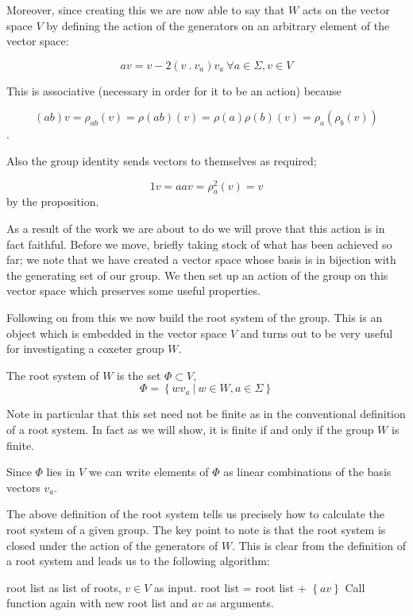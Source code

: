 \documentclass[a4paper,12pt]{article}
\begin{document}
Moreover, since creating this we are now able to say that $W$ acts on the vector space $V$ by defining the action of the generators on an arbitrary element of the vector space:

\begin{equation*}
	av = v - 2(v \: . \: v_a)v_a \: \forall a \in \Sigma, v \in V
\end{equation*}

This is associative (necessary in order for it to be an action) because 

\[(ab)v = \rho_{ab}(v) = \rho(ab)(v) = \rho(a)\rho(b)(v) = \rho_a(\rho_b(v))\].

Also the group identity sends vectors to themselves as required; 

\[1v = aav = \rho_a^2(v) = v\] by the proposition. 

As a result of the work we are about to do we will prove that this action is in fact faithful. Before we move, briefly taking stock of what has been achieved so far; we note that we have created a vector space whose basis is in bijection with the generating set of our group. We then set up an action of the group on this vector space which preserves some useful properties. 

Following on from this we now build the root system of the group. This is an object which is embedded in the vector space $V$ and turns out to be very useful for investigating a coxeter group $W$.

\begin{definition}
	The root system of $W$ is the set $\Phi \subset V$, 
	\[\Phi = \left\{ wv_a \: | \: w \in W, a \in \Sigma\right\}\]
\end{definition}

Note in particular that this set need not be finite as in the conventional definition of a root system. In fact as we will show, it is finite if and only if the group $W$ is finite. 

Since $\Phi$ lies in $V$ we can write elements of $\Phi$ as linear combinations of the basis vectors $v_a$.

The above definition of the root system tells us precisely how to calculate the root system of a given group. The key point to note is that the root system is closed under the action of the generators of $W$. This is clear from the definition of a root system and leads us to the following algorithm:

\begin{algorithmic}[1]
	\REQUIRE root list as list of roots, $v \in V$ as input.
			\STATE root list = root list + $\left\{av\right\}$
			\STATE Call function again with new root list and $av$ as arguments.
		\ENDIF
	\ENDFOR
\end{algorithmic}
\end{document}
